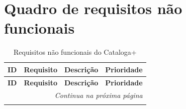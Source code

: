 \chapter{Quadro de requisitos não funcionais}
\label{ape:rnf}

\begin{longtable}{|p{}|p{}|p{}|p{}|}
    \caption{Requisitos não funcionais do Cataloga+}
    \label{qua:rnf} \\
    \hline
    \textbf{ID} & \textbf{Requisito} & \textbf{Descrição} & \textbf{Prioridade} \\ \hline
    \endfirsthead
    \hline
    \textbf{ID} & \textbf{Requisito} & \textbf{Descrição} & \textbf{Prioridade} \\ \hline
    \endhead
    \hline \multicolumn{4}{r}{\textit{Continua na próxima página}} \\
    \endfoot
    \hline
    \endlastfoot


\end{longtable}
